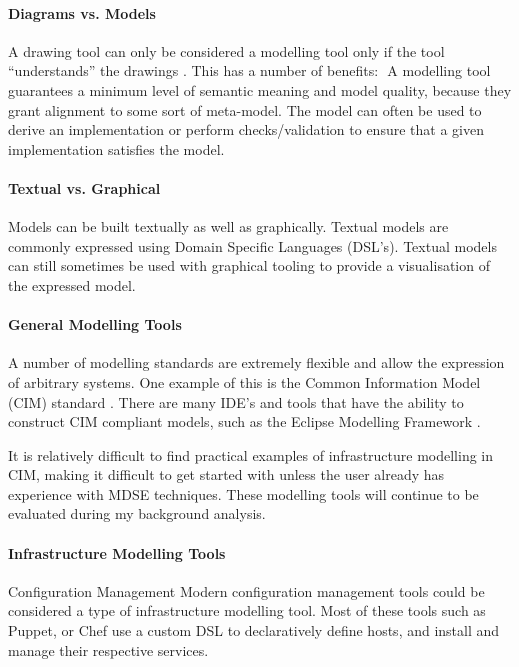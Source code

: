 \documentclass{cshonours}
\begin{document}
\paragraph{Diagrams vs. Models}
A drawing tool can only be considered a modelling tool only if the tool “understands” the drawings \cite[p.~11]{ModelDrivenDevelopment}. This has a number of benefits: 
A modelling tool guarantees a minimum level of semantic meaning and model quality, because they grant alignment to some sort of meta-model. \cite[p.~12]{ModelDrivenDevelopment}
The model can often be used to derive an implementation or perform checks/validation to ensure that a given implementation satisfies the model. 

\paragraph{Textual vs. Graphical}
Models can be built textually as well as graphically. Textual models are commonly expressed using Domain Specific Languages (DSL’s). Textual models can still sometimes be used with graphical tooling to provide a visualisation of the expressed model.

\paragraph{General Modelling Tools}

A number of modelling standards are extremely flexible and allow the expression of arbitrary systems. One example of this is the Common Information Model (CIM) standard \cite{CIM}. There are many IDE’s and tools that have the ability to construct CIM compliant models, such as the Eclipse Modelling Framework \cite{EMF}.

It is relatively difficult to find practical examples of infrastructure modelling in CIM, making it difficult to get started with unless the user already has experience with MDSE techniques. These modelling tools will continue to be evaluated during my background analysis.

\paragraph{Infrastructure Modelling Tools}

Configuration Management
Modern configuration management tools could be considered a type of infrastructure modelling tool. Most of these tools such as Puppet, or Chef use a custom DSL to declaratively define hosts, and install and manage their respective services.
\end{document}
